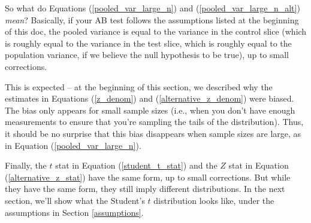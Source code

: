 \documentclass{article}
\numberwithin{equation}{section}
\begin{document}
So what do Equations (\ref{pooled_var_large_n}) and (\ref{pooled_var_large_n_alt}) \textit{mean}? Basically, if your AB test follows the assumptions listed at the beginning of this doc, the pooled variance is equal to the variance in the control slice (which is roughly equal to the variance in the test slice, which is roughly equal to the population variance, if we believe the null hypothesis to be true), up to small corrections. 

This is expected -- at the beginning of this section, we described why the estimates in Equations (\ref{z_denom}) and (\ref{alternative_z_denom}) were biased. The bias only appears for small sample sizes (i.e., when you don't have enough measurements to ensure that you're sampling the tails of the distribution). Thus, it should be no surprise that this bias disappears when sample sizes are large, as in Equation (\ref{pooled_var_large_n}).

Finally, the $t$ stat in Equation (\ref{student_t_stat}) and the $Z$ stat in Equation (\ref{alternative_z_stat}) have the same form, up to small corrections. But while they have the same form, they still imply different distributions. In the next section, we'll show what the Student's $t$ distribution looks like, under the assumptions in Section \ref{assumptions}.
\end{document}
